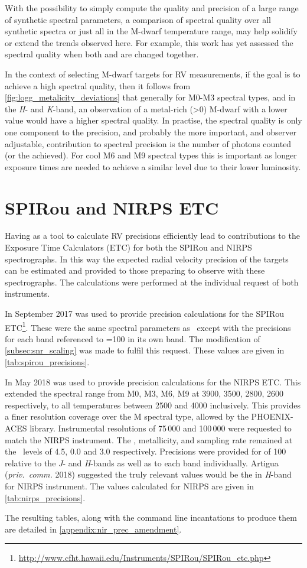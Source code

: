 With the possibility to simply compute the quality and precision of a large range of synthetic spectral parameters, a comparison of spectral quality over all synthetic spectra or just all in the M-dwarf temperature range, may help solidify or extend the trends observed here. For example, this work has yet assessed the spectral quality when both \feh{} and \Logg{} are changed together.

In the context of selecting M-dwarf targets for {RV} measurements, if the goal is to achieve a high spectral quality, then it follows from \cref{fig:logg_metalicity_deviations} that generally for {M0}-M3 spectral types, and in the \emph{H}- and \emph{K}-band, an observation of a metal-rich (\feh{}>0) M-dwarf with a lower \Logg{} value would have a higher spectral quality.
In practise, the spectral quality is only one component to the precision, and probably the more important, and observer adjustable,  contribution to spectral precision is the number of photons counted (or the \snr{} achieved).
For cool {M6} and {M9} spectral types this is important as longer exposure times are needed to achieve a similar \snr{} level due to their lower luminosity.


\section{{SPIRou} and {NIRPS} {ETC}}
\label{sec:spirou_nirps_etc}
Having \eniric{} as a tool to calculate {RV} precisions efficiently lead to contributions to the Exposure Time Calculators (ETC) for both the {SPIRou} and {NIRPS} spectrographs.
In this way the expected radial velocity precision of the targets can be estimated and provided to those preparing to observe with these spectrographs.
The calculations were performed at the individual request of both instruments.

In September 2017 \eniric{} was used to provide precision calculations for the {SPIRou} ETC\footnote{\url{http://www.cfht.hawaii.edu/Instruments/SPIRou/SPIRou_etc.php}}.
These were the same spectral parameters as~\citet{figueira_radial_2016} except with the precisions for each band referenced to {\snr{}=100} in its own band.
The modification of \cref{subsec:snr_scaling} was made to fulfil this request.
These values are given in \cref{tab:spirou_precisions}.

In May 2018 \eniric{} was used to provide precision calculations for the {NIRPS} {ETC}.
This extended the spectral range from {M0}, {M3}, {M6}, {M9} at 3900, 3500, 2800, 2600\K{} respectively, to all temperatures between 2500\K{} and 4000\K{} inclusively.
This provides a finer resolution coverage over the M spectral type, allowed by the {PHOENIX-ACES} library.
Instrumental resolutions of 75\,000 and 100\,000 were requested to match the {NIRPS} instrument.
The \Logg{}, metallicity, and sampling rate remained at the~\citet{figueira_radial_2016} levels of 4.5, 0.0 and 3.0 respectively.
Precisions were provided for \snr{} of 100 relative to the \emph{J}- and \emph{H}-bands as well as to each band individually.
Artigua (\emph{priv.\ comm.} 2018) suggested the truly relevant values would be the \snr{} in \emph{H}-band for {NIRPS} instrument.
The values calculated for {NIRPS} are given in \cref{tab:nirps_precisions}.

The resulting tables, along with the command line incantations to produce them are detailed in \cref{appendix:nir_prec_amendment}.

\clearpage